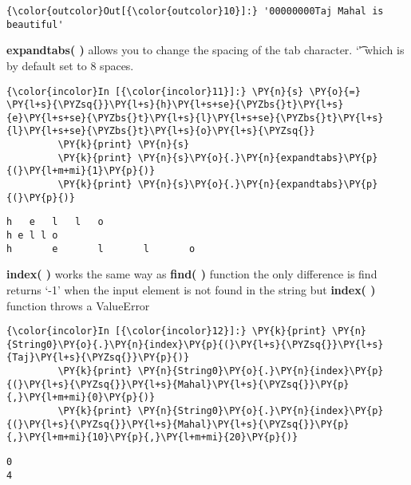             \begin{Verbatim}[commandchars=\\\{\}]
{\color{outcolor}Out[{\color{outcolor}10}]:} '00000000Taj Mahal is beautiful'
\end{Verbatim}
        
    \textbf{expandtabs( )} allows you to change the spacing of the tab
character. `\t' which is by default set to 8 spaces.

    \begin{Verbatim}[commandchars=\\\{\}]
{\color{incolor}In [{\color{incolor}11}]:} \PY{n}{s} \PY{o}{=} \PY{l+s}{\PYZsq{}}\PY{l+s}{h}\PY{l+s+se}{\PYZbs{}t}\PY{l+s}{e}\PY{l+s+se}{\PYZbs{}t}\PY{l+s}{l}\PY{l+s+se}{\PYZbs{}t}\PY{l+s}{l}\PY{l+s+se}{\PYZbs{}t}\PY{l+s}{o}\PY{l+s}{\PYZsq{}}
         \PY{k}{print} \PY{n}{s}
         \PY{k}{print} \PY{n}{s}\PY{o}{.}\PY{n}{expandtabs}\PY{p}{(}\PY{l+m+mi}{1}\PY{p}{)}
         \PY{k}{print} \PY{n}{s}\PY{o}{.}\PY{n}{expandtabs}\PY{p}{(}\PY{p}{)}
\end{Verbatim}

    \begin{Verbatim}[commandchars=\\\{\}]
h	e	l	l	o
h e l l o
h       e       l       l       o
    \end{Verbatim}

    \textbf{index( )} works the same way as \textbf{find( )} function the
only difference is find returns `-1' when the input element is not found
in the string but \textbf{index( )} function throws a ValueError

    \begin{Verbatim}[commandchars=\\\{\}]
{\color{incolor}In [{\color{incolor}12}]:} \PY{k}{print} \PY{n}{String0}\PY{o}{.}\PY{n}{index}\PY{p}{(}\PY{l+s}{\PYZsq{}}\PY{l+s}{Taj}\PY{l+s}{\PYZsq{}}\PY{p}{)}
         \PY{k}{print} \PY{n}{String0}\PY{o}{.}\PY{n}{index}\PY{p}{(}\PY{l+s}{\PYZsq{}}\PY{l+s}{Mahal}\PY{l+s}{\PYZsq{}}\PY{p}{,}\PY{l+m+mi}{0}\PY{p}{)}
         \PY{k}{print} \PY{n}{String0}\PY{o}{.}\PY{n}{index}\PY{p}{(}\PY{l+s}{\PYZsq{}}\PY{l+s}{Mahal}\PY{l+s}{\PYZsq{}}\PY{p}{,}\PY{l+m+mi}{10}\PY{p}{,}\PY{l+m+mi}{20}\PY{p}{)}
\end{Verbatim}

    \begin{Verbatim}[commandchars=\\\{\}]
0
4
    \end{Verbatim}

